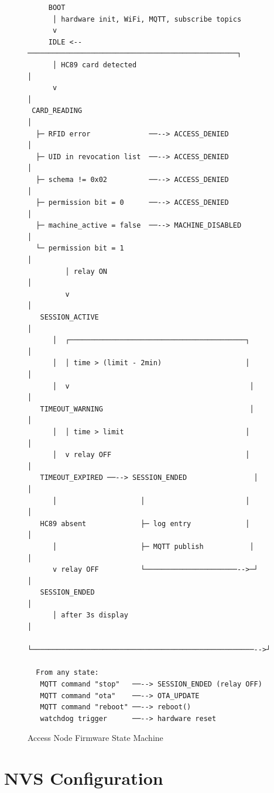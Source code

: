 \begin{figure}[H]
\centering
\begin{verbatim}
     BOOT
      │ hardware init, WiFi, MQTT, subscribe topics
      v
     IDLE <--──────────────────────────────────────────────────┐
      │ HC89 card detected                                    │
      v                                                       │
 CARD_READING                                                 │
  ├─ RFID error              ──--> ACCESS_DENIED                │
  ├─ UID in revocation list  ──--> ACCESS_DENIED                │
  ├─ schema != 0x02          ──--> ACCESS_DENIED                │
  ├─ permission bit = 0      ──--> ACCESS_DENIED                │
  ├─ machine_active = false  ──--> MACHINE_DISABLED             │
  └─ permission bit = 1                                       │
         │ relay ON                                           │
         v                                                    │
   SESSION_ACTIVE                                             │
      │  ┌──────────────────────────────────────────┐        │
      │  │ time > (limit - 2min)                    │        │
      │  v                                           │        │
   TIMEOUT_WARNING                                   │        │
      │  │ time > limit                             │        │
      │  v relay OFF                                │        │
   TIMEOUT_EXPIRED ──--> SESSION_ENDED                │        │
      │                    │                        │        │
   HC89 absent             ├─ log entry             │        │
      │                    ├─ MQTT publish           │        │
      v relay OFF          └──────────────────────-->─┘        │
   SESSION_ENDED                                              │
      │ after 3s display                                      │
      └─────────────────────────────────────────────────────-->┘

  From any state:
   MQTT command "stop"   ──--> SESSION_ENDED (relay OFF)
   MQTT command "ota"    ──--> OTA_UPDATE
   MQTT command "reboot" ──--> reboot()
   watchdog trigger      ──--> hardware reset
\end{verbatim}
\caption{Access Node Firmware State Machine}
\label{fig:state_machine}
\end{figure}

\section{NVS Configuration}

